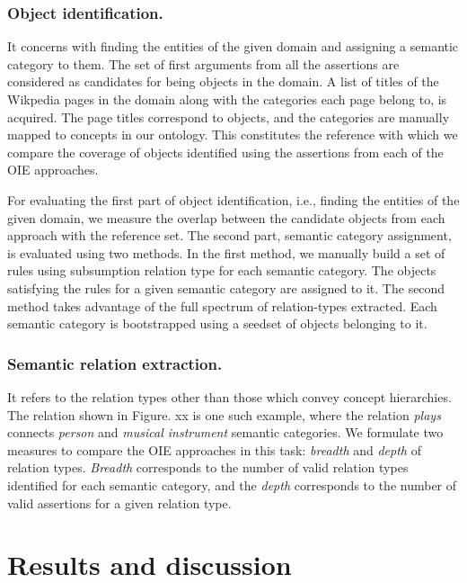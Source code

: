 \documentclass{llncs}
\begin{document}
\subsubsection{Object identification.} It concerns with finding the entities of the given domain and assigning a semantic category to them. The set of first arguments from all the assertions are considered as candidates for being objects in the domain. A list of titles of the Wikpedia pages in the domain along with the categories each page belong to, is acquired.  The page titles correspond to objects, and the categories are manually mapped to concepts in our ontology. This constitutes the reference with which we compare the coverage of objects identified using the assertions from each of the OIE approaches.

For evaluating the first part of object identification, i.e., finding the entities of the given domain, we measure the overlap between the candidate objects from each approach with the reference set. The second part, semantic category assignment, is evaluated using two methods. In the first method, we manually build a set of rules using subsumption relation type for each semantic category. The objects satisfying the rules for a given semantic category are assigned to it. The second method takes advantage of the full spectrum of relation-types extracted. Each semantic category is bootstrapped using a seedset of objects belonging to it.


\subsubsection{Semantic relation extraction.} It refers to the relation types other than those which convey concept hierarchies. The relation shown in Figure. xx is one such example, where the relation \textit{plays} connects \textit{person} and \textit{musical instrument} semantic categories. We formulate two measures  to compare the OIE approaches in this task: \textit{breadth} and \textit{depth} of relation types. \textit{Breadth} corresponds to the number of valid relation types identified for each semantic category, and the \textit{depth} corresponds to the number of valid assertions for a given relation type.

\section{Results and discussion}
\end{document}
